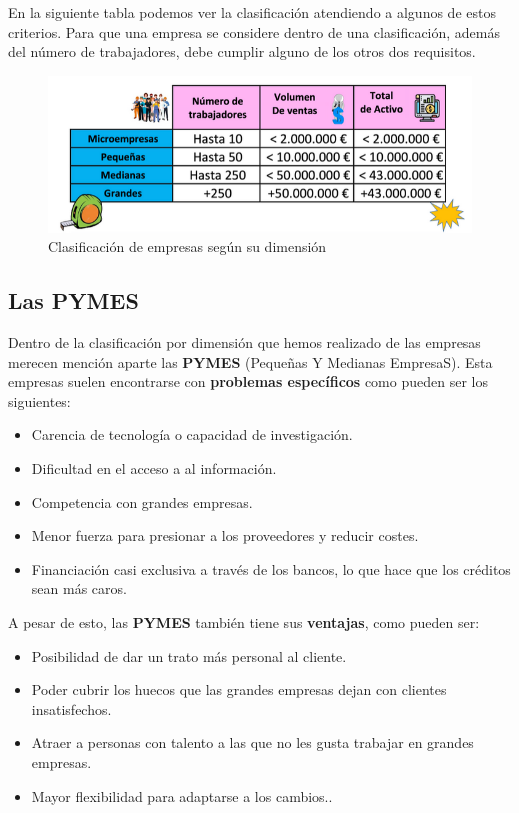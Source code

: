 En la siguiente tabla podemos ver la clasificación atendiendo a algunos de estos criterios. Para que una empresa se considere dentro de una clasificación, además del número de trabajadores, debe cumplir alguno de los otros dos requisitos.

\begin{figure}[H]
    \centering
    \includegraphics[scale=0.50]{empresas-dimension.png}
    \caption{Clasificación de empresas según su dimensión}
\end{figure}

\subsection{Las PYMES}
Dentro de la clasificación por dimensión que hemos realizado de las empresas merecen mención aparte las \textbf{PYMES} (Pequeñas Y Medianas EmpresaS). Esta empresas suelen encontrarse con \textbf{problemas específicos} como pueden ser los siguientes:

\begin{itemize}
    \item Carencia de tecnología o capacidad de investigación.
    \item Dificultad en el acceso a al información.
    \item Competencia con grandes empresas.
    \item Menor fuerza para presionar a los proveedores y reducir costes.
    \item Financiación casi exclusiva a través de los bancos, lo que hace que los créditos sean más caros.
\end{itemize}

A pesar de esto, las \textbf{PYMES} también tiene sus \textbf{ventajas}, como pueden ser:

\begin{itemize}
    \item Posibilidad de dar un trato más personal al cliente.
    \item Poder cubrir los huecos que las grandes empresas dejan con clientes insatisfechos.
    \item Atraer a personas con talento a las que no les gusta trabajar en grandes empresas.
    \item Mayor flexibilidad para adaptarse a los cambios..
\end{itemize}


\appendix









